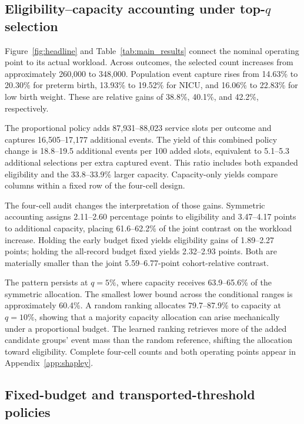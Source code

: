 \documentclass{article}
\begin{document}
\subsection{Eligibility--capacity accounting under \texorpdfstring{top-$q$}{top-q} selection}

Figure~\ref{fig:headline} and Table~\ref{tab:main_results} connect the nominal
operating point to its actual workload. Across outcomes, the selected count
increases from approximately 260,000 to 348,000. Population event capture rises
from 14.63\% to 20.30\% for preterm birth, 13.93\% to 19.52\% for NICU, and
16.06\% to 22.83\% for low birth weight. These are relative gains of
38.8\%, 40.1\%, and 42.2\%, respectively.

The proportional policy adds 87,931--88,023 service slots per outcome and
captures 16,505--17,177 additional events. The yield of this combined policy
change is 18.8--19.5 additional events per 100 added slots, equivalent to
5.1--5.3 additional selections per extra captured event. This ratio includes
both expanded eligibility and the 33.8--33.9\% larger capacity. Capacity-only yields
compare columns within a fixed row of the four-cell design.



The four-cell audit changes the interpretation of those gains. Symmetric
accounting assigns 2.11--2.60 percentage points to eligibility and
3.47--4.17 points to additional capacity, placing 61.6--62.2\% of the joint
contrast on the workload increase. Holding the early budget fixed yields
eligibility gains of 1.89--2.27 points; holding the all-record budget fixed
yields 2.32--2.93 points. Both are materially smaller than the joint
5.59--6.77-point cohort-relative contrast.

The pattern persists at $q=5\%$, where capacity receives 63.9--65.6\% of the
symmetric allocation. The smallest lower bound across the conditional ranges
is approximately 60.4\%. A random ranking allocates 79.7--87.9\% to capacity at
$q=10\%$, showing that a majority capacity allocation can arise mechanically
under a proportional budget. The learned ranking retrieves more of the added
candidate groups' event mass than the random reference, shifting the allocation
toward eligibility. Complete four-cell counts and both operating points appear
in Appendix~\ref{app:shapley}.

\subsection{Fixed-budget and transported-threshold policies}
\end{document}
